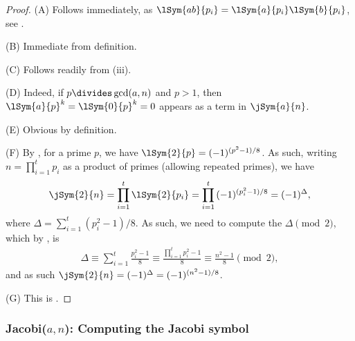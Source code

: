 \begin{proof}
    (A) Follows immediately, as
    $\lSym{a b}{p_i} = \lSym{a}{p_i} \lSym{b}{p_i}$,\newline
    see .

    (B) Immediate from definition.

    (C) Follows readily from  (iii).

    (D) Indeed, if $p \divides \gcd( a, n)$ and $p >1$, then
    $\lSym{a}{p}^k = \lSym{0}{p}^k = 0$ appears as a term in
    $\jSym{a}{n}$.

    (E) Obvious by definition.

    (F) By , for a prime $p$, we have
    $\lSym{2}{p} = (-1)^{(p^2 - 1)/8}$. As such, writing $n =
    \prod_{i=1}^t p_i$ as a product of primes (allowing repeated
    primes), we have
    \begin{align*}
        \jSym{2}{n}%
        =%
        \prod_{i=1}^t \lSym{2}{p_i}%
        =%
        \prod_{i=1}^t {(-1)^{(p_i^2 - 1)/8}}%
        =%
        (-1)^\Delta,
    \end{align*}
    where $\Delta = \sum_{i =1}^t (p_i^2 - 1)/8$.  As such, we need to
    compute the $\Delta \pmod{2}$, which by , is
    \begin{align*}
        \Delta%
        \equiv%
        \sum_{i =1}^t \frac{p_i^2 - 1}{8}%
        \equiv%
        \frac{\prod_{i =1}^t p_i^2 - 1}{8}%
        \equiv%
        \frac{n^2 - 1}{8}%
        \pmod{2}, 
    \end{align*}
    and as such $\jSym{2}{n} = (-1)^\Delta = (-1)^{(n^2 -1 ) /8}$.

    (G) This is .
\end{proof}



\newcommand{\algJacobi}{\Algorithm{Jacobi}\xspace}

\subsubsection{Jacobi{}($a,n$): Computing the Jacobi symbol}

